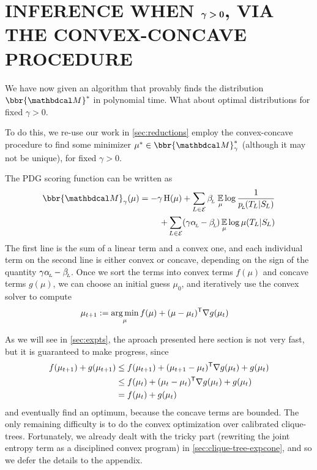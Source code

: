 \documentclass[twoside]{article}
\begin{document}
\section{INFERENCE WHEN
    \texorpdfstring{$\boldsymbol\gamma \boldsymbol> \mathbf{0}$}{gamma > 0},
    VIA THE CONVEX-CONCAVE PROCEDURE }

We have now given an algorithm that provably finds the distribution $\bbr{\dg M}^*$ in polynomial time. 
What about optimal distributions for fixed $\gamma > 0$.



To do this, we re-use our work in \cref{sec:reductions} employ the convex-concave procedure 
\parencite{yuille2003concave} to find some minimizer $\mu^* \in \bbr{\dg M}^*_\gamma$ (although it may not be unique), for fixed $\gamma > 0$.

The PDG scoring function can be written as \parencite[Proposition 4.6]{pdg-aaai}
\begin{align*}
    \bbr{\dg M}_\gamma(\mu) = 
        -\gamma\H(\mu) + 
            \sum_{L \in \Ed}
                \beta\ssub L\, \Ex_\mu 
                    \log \frac1{p\ssub L(\Tgt L | \Src L)}
                \\
            + \sum_{L \in \Ed}
            (\gamma \alpha \ssub L - \beta\ssub L)
                \Ex_\mu \log \mu(\Tgt L | \Src L)
\end{align*}
The first line is the sum of a linear term and a convex one,
and each individual term on the second line is either convex or
concave, depending on the sign of the quantity $\gamma \alpha_{\!_{L}\!} -
\beta_{\!_{L}\!}$.  
Once we sort the terms into convex terms $f(\mu)$ and concave terms $g(\mu)$, we can choose an initial guess $\mu_0$, and iteratively use the convex solver to compute
%
\begin{align*}
    \mu_{t+1} &:= \operatorname*{arg\,min}_{\mu} f(\mu) + (\mu - \mu_{t})^{\sf T}
        \nabla g(\mu_t)
\end{align*}

As we will see in \cref{sec:expts}, the aproach presented here section is 
not very fast, but it is guaranteed to make progress, since
\begin{align*}
    f(\mu_{t+1}) + g(\mu_{t+1}) &\le  f(\mu_{t+1}) + (\mu_{t+1}-\mu_t)^{\sf T} \nabla g(\mu_t) + g(\mu_t)
        \\
    &\le  f(\mu_t) + (\mu_t - \mu_{t})^{\sf T}\nabla g(\mu_t)  + g(\mu_t)
        \\
    &= f(\mu_t) + g(\mu_t)
\end{align*}
and eventually find an optimum, because the concave terms are bounded.
%
%
The only remaining difficulty is to do the convex optimization over
calibrated clique-trees. Fortunately, we already dealt with the 
tricky part (rewriting the joint entropy term as a disciplined convex program) in 
\cref{sec:clique-tree-expcone},
and so we defer the details to the appendix.
    
\end{document}
